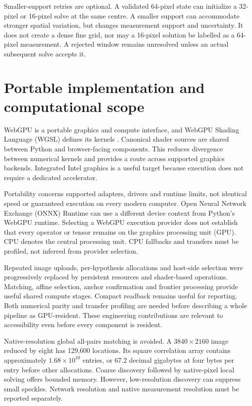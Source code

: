 \documentclass[11pt,a4paper]{article}
\begin{document}
Smaller-support retries are optional. A validated 64-pixel state can initialize a 32-pixel or 16-pixel solve at the same centre. A smaller support can accommodate stronger spatial variation, but changes measurement support and uncertainty. It does not create a dense fine grid, nor may a 16-pixel solution be labelled as a 64-pixel measurement. A rejected window remains unresolved unless an actual subsequent solve accepts it.

\section{Portable implementation and computational scope}
WebGPU is a portable graphics and compute interface, and WebGPU Shading Language (WGSL) defines its kernels \citep{webgpu,wgsl}. Canonical shader sources are shared between Python and browser-facing components. This reduces divergence between numerical kernels and provides a route across supported graphics backends. Integrated Intel graphics is a useful target because execution does not require a dedicated accelerator.

Portability concerns supported adapters, drivers and runtime limits, not identical speed or guaranteed execution on every modern computer. Open Neural Network Exchange (ONNX) Runtime can use a different device context from Python's WebGPU runtime. Selecting a WebGPU execution provider does not establish that every operator or tensor remains on the graphics processing unit (GPU). CPU denotes the central processing unit. CPU fallbacks and transfers must be profiled, not inferred from provider selection.

Repeated image uploads, per-hypothesis allocations and host-side selection were progressively replaced by persistent resources and shader-based operations. Matching, affine selection, anchor confirmation and frontier processing provide useful shared compute stages. Compact readback remains useful for reporting. Both numerical parity and transfer profiling are needed before describing a whole pipeline as GPU-resident. These engineering contributions are relevant to accessibility even before every component is resident.

Native-resolution global all-pairs matching is avoided. A $3840\times2160$ image reduced by eight has 129,600 locations. Its square correlation array contains approximately $1.68\times10^{10}$ entries, or 67.2 decimal gigabytes at four bytes per entry before other allocations. Coarse discovery followed by native-pixel local solving offers bounded memory. However, low-resolution discovery can suppress small speckles. Network resolution and native measurement resolution must be reported separately.
\end{document}
